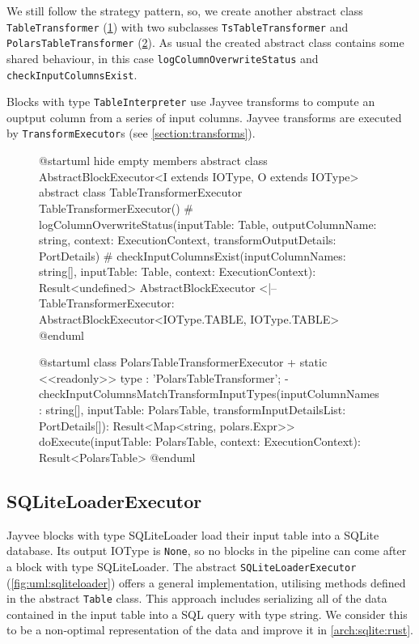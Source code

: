 We still follow the strategy pattern, so, we create another abstract class \Verb|TableTransformer| (\ref{fig:uml:tabletransformer}) with two subclasses \Verb|TsTableTransformer| and \Verb|PolarsTableTransformer| (\ref{fig:uml:polarstabletransformer}).
As usual the created abstract class contains some shared behaviour, in this case \Verb|logColumnOverwriteStatus| and \Verb|checkInputColumnsExist|.

Blocks with type \Verb|TableInterpreter| use Jayvee transforms to compute an ouptput column from a series of input columns.
Jayvee transforms are executed by \Verb|TransformExecutor|s (see \ref{section:transforms}).

\begin{figure}
	\begin{plantuml}
		@startuml
		hide empty members
		abstract class AbstractBlockExecutor<I extends IOType, O extends IOType>
		abstract class TableTransformerExecutor {
				TableTransformerExecutor()
				# logColumnOverwriteStatus(inputTable: Table, outputColumnName: string, context: ExecutionContext, transformOutputDetails: PortDetails)
				# checkInputColumnsExist(inputColumnNames: string[], inputTable: Table, context: ExecutionContext): Result<undefined>
			}
		AbstractBlockExecutor <|-- TableTransformerExecutor: AbstractBlockExecutor<IOType.TABLE, IOType.TABLE>
		@enduml
	\end{plantuml}
	\caption{}
	\label{fig:uml:tabletransformer}
\end{figure}
\begin{figure}
	\begin{plantuml}
		@startuml
		class PolarsTableTransformerExecutor  {
		+ {static} <<readonly>> type : 'PolarsTableTransformer';
		- checkInputColumnsMatchTransformInputTypes(inputColumnNames: string[], inputTable: PolarsTable, transformInputDetailsList: PortDetails[]): Result<Map<string, polars.Expr>>
		doExecute(inputTable: PolarsTable, context: ExecutionContext): Result<PolarsTable>
		}
		@enduml
	\end{plantuml}
	\caption{}
	\label{fig:uml:polarstabletransformer}
\end{figure}

\subsection{SQLiteLoaderExecutor}
Jayvee blocks with type SQLiteLoader load their input table into a SQLite database.
Its output IOType is \Verb|None|, so no blocks in the pipeline can come after a block with type SQLiteLoader.
The abstract \Verb|SQLiteLoaderExecutor| (\ref{fig:uml:sqliteloader}) offers a general implementation, utilising methods defined in the abstract \Verb|Table| class.
This approach includes serializing all of the data contained in the input table into a \ac{SQL} query with type string.
We consider this to be a non-optimal representation of the data and improve it in \ref{arch:sqlite:rust}.

